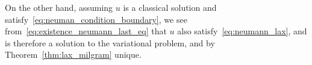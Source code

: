 \begin{bev}
   On the other hand, assuming $u$ is a classical solution and satisfy~\eqref{eq:neuman_condition_boundary},
   we see from~\eqref{eq:existence_neumann_last_eq} that $u$ also satisfy~\eqref{eq:neumann_lax}, and is therefore a solution to the variational 
   problem, and by Theorem~\ref{thm:lax_milgram} unique.
\end{bev}

